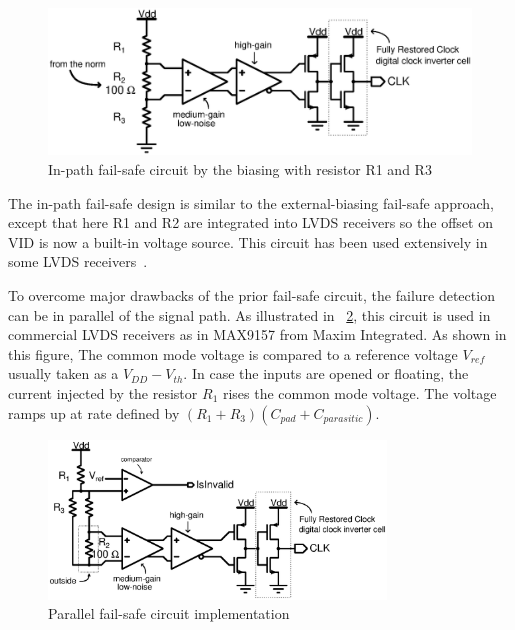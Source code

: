 \begin{figure}[htp]
    \centering
    \includegraphics[width=\textwidth]{Chapter5/Figs/adc_chip/lvds-external-failsafe.ps}
    \caption{In-path fail-safe circuit by the biasing with resistor R1 and R3}
    \label{fig:in-path-fail-safe}
\end{figure}


The in-path fail-safe design is similar to the external-biasing fail-safe approach, except that here R1 and R2 are integrated into LVDS receivers so the offset on VID is now a built-in voltage source. This circuit has been used extensively in some LVDS receivers~\cite{TI-SLLA082B}. 

To overcome major drawbacks of the prior fail-safe circuit, the failure detection can be in parallel of the signal path. As illustrated in \figurename~\ref{fig:parallel-fail-safe}, this circuit is used in commercial LVDS receivers as in MAX9157 from Maxim Integrated. As shown in this figure, The common mode voltage is compared to a reference voltage $V_{ref}$ usually taken as a $V_{DD}-V_{th}$. In case the inputs are opened or floating, the current injected by the resistor $R_1$ rises the common mode voltage. The voltage ramps up at rate defined by $(R_1+R_3)(C_{pad}+C_{parasitic})$.

\begin{figure}[htp]
    \centering
    \includegraphics[width=0.8\textwidth]{Chapter5/Figs/adc_chip/lvds-parallel-failsafe.ps}
    \caption{Parallel fail-safe circuit implementation}
    \label{fig:parallel-fail-safe}
\end{figure}

